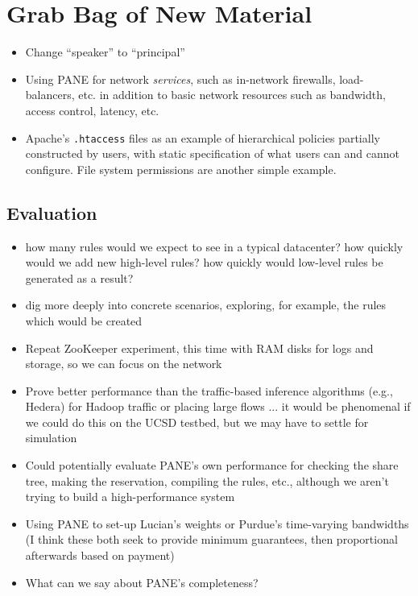 \chapter{Grab Bag of New Material}

\begin{itemize}
\item Change ``speaker'' to ``principal''

\item Using PANE for network \emph{services}, such as in-network firewalls, load-balancers, etc. in addition to basic network resources such as bandwidth, access control, latency, etc.

\item Apache's \verb/.htaccess/ files as an example of hierarchical policies partially constructed by users, with static specification of what users can and cannot configure. File system permissions are another simple example.
\end{itemize}

\section{Evaluation}
\begin{itemize}
\item how many rules would we expect to see in a typical datacenter? how quickly would we add new high-level rules? how quickly would low-level rules be generated as a result?
\item dig more deeply into concrete scenarios, exploring, for example, the rules which would be created
\item Repeat ZooKeeper experiment, this time with RAM disks for logs and storage, so we can focus on the network
\item Prove better performance than the traffic-based inference algorithms (e.g., Hedera) for Hadoop traffic or placing large flows ... it would be phenomenal if we could do this on the UCSD testbed, but we may have to settle for simulation
\item Could potentially evaluate PANE's own performance for checking the share tree, making the reservation, compiling the rules, etc., although we aren't trying to build a high-performance system
\item Using PANE to set-up Lucian's weights or Purdue's time-varying bandwidths
(I think these both seek to provide minimum guarantees, then proportional afterwards based on payment)
\item What can we say about PANE's completeness?
\end{itemize}

